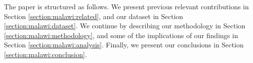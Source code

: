%
%
The paper is structured as follows. We present previous relevant contributions in Section \ref{section:malawi:related}, and our dataset in Section \ref{section:malawi:dataset}. We continue by describing our methodology in Section \ref{section:malawi:methodology}, and some of the implications of our findings in Section \ref{section:malawi:analysis}. Finally, we present our conclusions in Section \ref{section:malawi:conclusion}.

